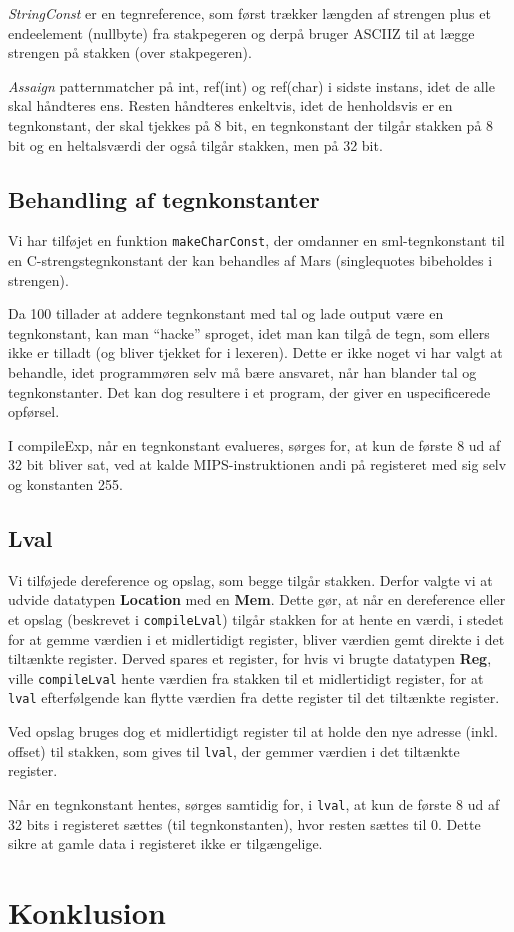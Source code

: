 \documentclass[a4paper, 10pt]{article}
\begin{document}
\textit{StringConst} er en tegnreference, som først trækker længden af strengen
plus et endeelement (nullbyte) fra stakpegeren og derpå bruger ASCIIZ til at
lægge strengen på stakken (over stakpegeren).

\textit{Assaign} patternmatcher på int, ref(int) og ref(char) i sidste instans,
idet de alle skal håndteres ens. Resten håndteres enkeltvis, idet de
henholdsvis er en tegnkonstant, der skal tjekkes på 8 bit, en tegnkonstant
der tilgår stakken på 8 bit og en heltalsværdi der også tilgår
stakken, men på 32 bit.

\subsection{Behandling af tegnkonstanter}
Vi har tilføjet en funktion \texttt{makeCharConst}, der omdanner en
sml-tegnkonstant til en C-strengstegnkonstant der kan behandles af Mars
(singlequotes bibeholdes i strengen).

Da 100 tillader at addere tegnkonstant med tal og lade output være en
tegnkonstant, kan man ``hacke'' sproget, idet man kan tilgå de tegn, som ellers
ikke er tilladt (og bliver tjekket for i lexeren). Dette er ikke noget vi har
valgt at behandle, idet programmøren selv må bære ansvaret, når han blander tal
og tegnkonstanter. Det kan dog resultere i et program, der giver en
uspecificerede opførsel.

I compileExp, når en tegnkonstant evalueres, sørges for, at kun de første 8 ud
af 32 bit bliver sat, ved at kalde MIPS-instruktionen andi på registeret med
sig selv og konstanten 255. 

\subsection{Lval}
Vi tilføjede dereference og opslag, som begge tilgår stakken. Derfor valgte vi
at udvide datatypen \textbf{Location} med en \textbf{Mem}. Dette gør, at når en
dereference eller et opslag (beskrevet i \texttt{compileLval}) tilgår stakken 
for at hente en værdi, i stedet for at gemme værdien i et midlertidigt
register, bliver værdien gemt direkte i det tiltænkte register. Derved spares et
register, for hvis vi brugte datatypen \textbf{Reg}, ville \texttt{compileLval}
hente værdien fra stakken til et midlertidigt register, for at \texttt{lval}
efterfølgende kan flytte værdien fra dette register til det tiltænkte register.

Ved opslag bruges dog et midlertidigt register til at holde den nye adresse
(inkl. offset) til stakken, som gives til \texttt{lval}, der gemmer værdien i
det tiltænkte register.

Når en tegnkonstant hentes, sørges samtidig for, i \texttt{lval}, at kun de
første 8 ud af 32 bits i registeret sættes (til tegnkonstanten), hvor resten
sættes til 0. Dette sikre at gamle data i registeret ikke er tilgængelige.

\section{Konklusion}
\end{document}
